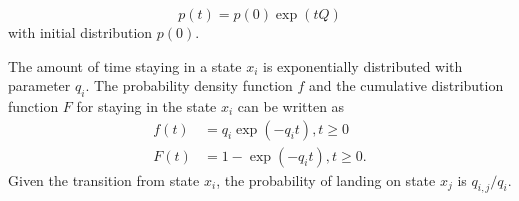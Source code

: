 \begin{equation}
p(t)=p(0) \exp (tQ)
\label{eq:ode_sol}
\end{equation}
with initial distribution $ p(0) $.\par
The amount of time staying in a state $ x_{i} $ is exponentially distributed with parameter $ q_{i} $. The probability density function $ f $ and the cumulative distribution function $ F $ for staying in the state $ x_{i} $ can be written as \cite{Nodelman1995}
\begin{align}
f(t) & = q_{i} \exp \left(-q_{i} t\right), t\geq 0  \label{eq:f(t)_homo}\\
F(t) & = 1 - \exp \left(-q_{i} t\right), t\geq 0 .
\end{align}
Given the transition from state $ x_{i} $, the probability of landing on state $ x_{j} $ is $ q_{i,j}/q_{i} $.
